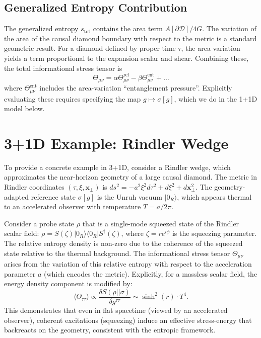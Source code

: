 \documentclass[aps,prd,twocolumn,superscriptaddress,nofootinbib,floatfix]{revtex4-2}
\newcommand{\Ddom}{\mathcal{D}}
\newcommand{\Tmn}{\Theta_{\mu\nu}}
\newcommand{\stot}{s_{\mathrm{tot}}}
\begin{document}
\subsection{Generalized Entropy Contribution}
The generalized entropy $\stot$ contains the area term $A[\partial \Ddom]/4G$. The variation of the area of the causal diamond boundary with respect to the metric is a standard geometric result.
For a diamond defined by proper time $\tau$, the area variation yields a term proportional to the expansion scalar and shear.
Combining these, the total informational stress tensor is
\begin{equation}
    \Tmn = \alpha \Tmn^{\mathrm{rel}} - \beta \Tmn^{\mathrm{ent}} + \dots
\end{equation}
where $\Tmn^{\mathrm{ent}}$ includes the area-variation ``entanglement pressure''.
Explicitly evaluating these requires specifying the map $g \mapsto \sigma[g]$, which we do in the 1+1D model below.

\section{3+1D Example: Rindler Wedge}
\label{appendix:rindler}

To provide a concrete example in 3+1D, consider a Rindler wedge, which approximates the near-horizon geometry of a large causal diamond.
The metric in Rindler coordinates $(\tau, \xi, \mathbf{x}_\perp)$ is $ds^2 = -a^2\xi^2 d\tau^2 + d\xi^2 + d\mathbf{x}_\perp^2$.
The geometry-adapted reference state $\sigma[g]$ is the Unruh vacuum $|0_R\rangle$, which appears thermal to an accelerated observer with temperature $T = a/2\pi$.

Consider a probe state $\rho$ that is a single-mode squeezed state of the Rindler scalar field: $\rho = S(\zeta) |0_R\rangle \langle 0_R| S^\dagger(\zeta)$, where $\zeta = re^{i\phi}$ is the squeezing parameter.
The relative entropy density is non-zero due to the coherence of the squeezed state relative to the thermal background.
The informational stress tensor $\Tmn$ arises from the variation of this relative entropy with respect to the acceleration parameter $a$ (which encodes the metric).
Explicitly, for a massless scalar field, the energy density component is modified by:
\begin{equation}
    \langle \Theta_{\tau\tau} \rangle \propto \frac{\delta S(\rho || \sigma)}{\delta g^{\tau\tau}} \sim \sinh^2(r) \cdot T^4.
\end{equation}
This demonstrates that even in flat spacetime (viewed by an accelerated observer), coherent excitations (squeezing) induce an effective stress-energy that backreacts on the geometry, consistent with the entropic framework.
\end{document}
